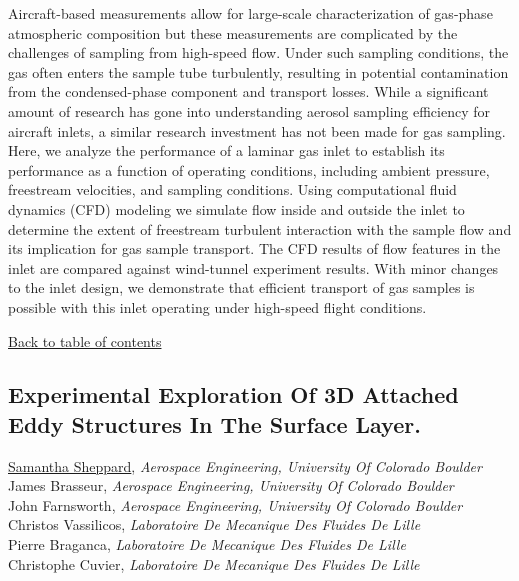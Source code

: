 \noindent Aircraft-based measurements allow for large-scale characterization of gas-phase atmospheric composition but these measurements are complicated by the challenges of sampling from high-speed flow.  Under such sampling conditions, the gas often enters the sample tube turbulently, resulting in potential contamination from the condensed-phase component and transport losses.  While a significant amount of research has gone into understanding aerosol sampling efficiency for aircraft inlets, a similar research investment has not been made for gas sampling.   Here, we analyze the performance of a laminar gas inlet to establish its performance as a function of operating conditions, including ambient pressure, freestream velocities, and sampling conditions.  Using computational fluid dynamics (CFD) modeling we simulate flow inside and outside the inlet to determine the extent of freestream turbulent interaction with the sample flow and its implication for gas sample transport.  The CFD results of flow features in the inlet are compared against wind-tunnel experiment results. With minor changes to the inlet design, we demonstrate that efficient transport of gas samples is possible with this inlet operating under high-speed flight conditions. \\ 
\begin{flushright}\vspace{-0.2 in}\hyperlink{toc}{Back to table of contents}\end{flushright}\vspace{-0.2 in}
\hypertarget{SamanthaSheppard}{\subsection*{\color{CUGOLD} Experimental Exploration Of 3D Attached Eddy Structures In The Surface Layer.}} \vsp 
\underline{Samantha Sheppard}, \textit{Aerospace Engineering, University Of Colorado Boulder}\\ 
{James Brasseur}, \textit{Aerospace Engineering, University Of Colorado Boulder}\\ 
{John Farnsworth}, \textit{Aerospace Engineering, University Of Colorado Boulder}\\ 
{Christos Vassilicos}, \textit{Laboratoire De Mecanique Des Fluides De Lille}\\ 
{Pierre Braganca}, \textit{Laboratoire De Mecanique Des Fluides De Lille}\\ 
{Christophe Cuvier}, \textit{Laboratoire De Mecanique Des Fluides De Lille}\\ 
